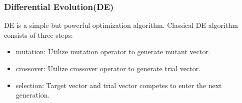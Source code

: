 \documentclass[xcolor=dvipsnames]{beamer}
\begin{document}
    \begin{frame}
    \frametitle{Differential Evolution(DE)}

    DE is a simple but powerful optimization algorithm. Classical DE algorithm consists of three steps:
    \begin{itemize}
    \item mutation: Utilize mutation operator to generate mutant vector.
    \item crossover: Utilize crossover operator to generate trial vector.
    \item selection: Target vector and trial vector competes to enter the next generation.
    \end{itemize}


    \end{frame}
\end{document}

